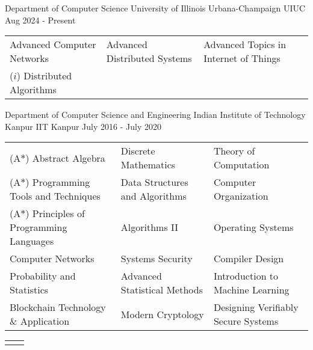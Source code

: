 

\begin{cventries}

\extraentry
  {Department of Computer Science}
  {University of Illinois Urbana-Champaign}
  {UIUC}
  {Aug 2024 - Present}
{\vspace*{-\baselineskip}\fontsize{9.5pt}{1.5em}\bodyfontlight\upshape\color{text}
  \setlength\extrarowheight{-3pt}
  \begin{tabular*}{\textwidth}{L{\textwidth/3} L{\textwidth/3} L{\textwidth/3}}
    Advanced Computer Networks & Advanced Distributed Systems & Advanced Topics in Internet of Things \\
    ($i$) Distributed Algorithms & & \\
\end{tabular*}}


\extraentry
  {Department of Computer Science and Engineering}
  {Indian Institute of Technology Kanpur}
  {IIT Kanpur}
  {July 2016 - July 2020}
{\vspace*{-\baselineskip}\fontsize{9.5pt}{1.5em}\bodyfontlight\upshape\color{text}
  \setlength\extrarowheight{-3pt}
  \begin{tabular*}{\textwidth}{L{\textwidth/3} L{\textwidth/3} L{\textwidth/3}}
    (A$*$) Abstract Algebra & Discrete Mathematics & Theory of Computation \\
    (A$*$) Programming Tools and Techniques & Data Structures and Algorithms & Computer Organization \\
    (A$*$) Principles of Programming Languages & Algorithms II & Operating Systems \\
    Computer Networks & Systems Security & Compiler Design \\
    Probability and Statistics & Advanced Statistical Methods & Introduction to Machine Learning \\
    Blockchain Technology \& Application & Modern Cryptology & Designing Verifiably Secure Systems \\ %
\end{tabular*}}

\end{cventries}

\fontsize{9.5pt}{1em}\footerfont\upshape\color{text}
\begin{tabular*}{\textwidth}{L{\textwidth/3 + 1cm} L{\textwidth/3}}
   &  \\
\end{tabular*}

